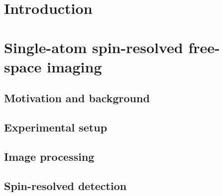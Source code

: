 \documentclass[twoside]{article}
\begin{document}






 \newpage


\newpage
\section{Introduction} \label{sec:intro}


\newpage
\section{Single-atom spin-resolved free-space imaging} \label{sec:imaging}

\subsection{Motivation and background}

\subsection{Experimental setup}

\subsection{Image processing}

\subsection{Spin-resolved detection}


\newpage
\end{document}
